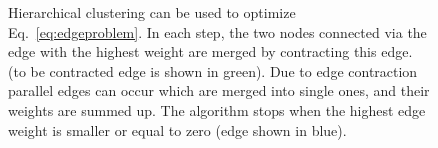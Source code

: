 \begin{center}
\begin{figure}[t]
\begin{center}
{\begin{tikzpicture}
    \end{tikzpicture}


}
\caption{
    Hierarchical clustering can be used to optimize
    Eq.~\ref{eq:edgeproblem}.
    In each step, the two nodes connected via the edge with 
    the highest weight are merged by contracting this edge.
    (to be contracted edge is shown in green).
    Due to edge contraction parallel edges can occur which 
    are merged into single ones, and their weights are summed up.
    The algorithm stops when the highest edge weight is smaller
    or equal to zero (edge shown in blue).
}\label{fig:hc_alg}
\end{center}
\end{figure}
\end{center}



